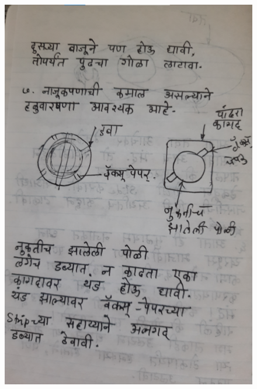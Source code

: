 \documentclass[17pt]{extarticle}  %
\begin{document}
\begin{figure}[h!]
    \centering
    \includegraphics{img/16-s.png}
\end{figure}
\end{document}
